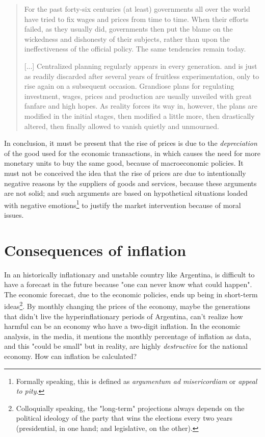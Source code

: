 \documentclass[12pt,a4paper,twoside]{book}
\begin{document}
\begin{quotation}
For the past forty-six centuries (at least) governments all over the world have tried to fix wages and prices from time to time. When their efforts failed, as they usually did, governments then put the blame on the wickedness and dishonesty of their subjects, rather than upon the ineffectiveness of the official policy. The same tendencies remain today.

[...] Centralized planning regularly appears in every generation. and is just as readily discarded after several years of fruitless experimentation, only to rise again on a subsequent occasion. Grandiose plans for regulating investment, wages, prices and production are usually unveiled with great fanfare and high hopes. As reality forces its way in, however, the plans are modified in the initial stages, then modified a little more, then drastically altered, then finally allowed to vanish quietly and unmourned. \cite[p. 9]{fortycenturies}
\end{quotation}

In conclusion, it must be present that the rise of prices is due to the \textit{depreciation} of the good used for the economic transactions, in which causes the need for more monetary units to buy the same good, because of macroeconomic policies. It must not be conceived the idea that the rise of prices are due to intentionally negative reasons by the suppliers of goods and services, because these arguments are not solid; and such arguments are based on hypothetical situations loaded with negative emotions\footnote{Formally speaking, this is defined as \textit{argumentum ad misericordiam} or \textit{appeal to pity}.} to justify the market intervention because of moral issues.

\section{Consequences of inflation}
In an historically inflationary and unstable country like Argentina, is difficult to have a forecast in the future because "one can never know what could happen". The economic forecast, due to the economic policies, ends up being in short-term ideas\footnote{Colloquially speaking, the "long-term" projections always depends on the political ideology of the party that wins the elections every two years (presidential, in one hand; and legislative, on the other).}. By monthly changing the prices of the economy, maybe the generations that didn't live the hyperinflationary periods of Argentina, can't realize how harmful can be an economy who have a two-digit inflation. In the economic analysis, in the media, it mentions the monthly percentage of inflation as data, and this "could be small" but in reality, are highly \textit{destructive} for the national economy. How can inflation be calculated?
\end{document}
